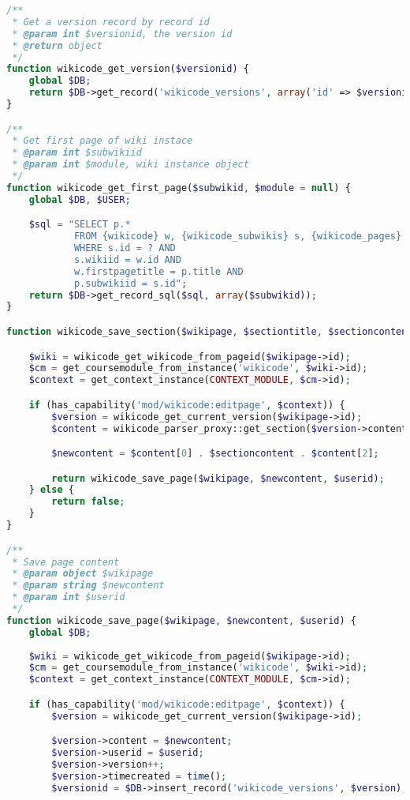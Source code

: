 \begin{lstlisting}[language=PHP]
/**
 * Get a version record by record id
 * @param int $versionid, the version id
 * @return object
 */
function wikicode_get_version($versionid) {
    global $DB;
    return $DB->get_record('wikicode_versions', array('id' => $versionid));
}

/**
 * Get first page of wiki instace
 * @param int $subwikiid
 * @param int $module, wiki instance object
 */
function wikicode_get_first_page($subwikid, $module = null) {
    global $DB, $USER;

    $sql = "SELECT p.*
            FROM {wikicode} w, {wikicode_subwikis} s, {wikicode_pages} p
            WHERE s.id = ? AND
            s.wikiid = w.id AND
            w.firstpagetitle = p.title AND
            p.subwikiid = s.id";
    return $DB->get_record_sql($sql, array($subwikid));
}

function wikicode_save_section($wikipage, $sectiontitle, $sectioncontent, $userid) {

    $wiki = wikicode_get_wikicode_from_pageid($wikipage->id);
    $cm = get_coursemodule_from_instance('wikicode', $wiki->id);
    $context = get_context_instance(CONTEXT_MODULE, $cm->id);

    if (has_capability('mod/wikicode:editpage', $context)) {
        $version = wikicode_get_current_version($wikipage->id);
        $content = wikicode_parser_proxy::get_section($version->content, $version->contentformat, $sectiontitle, true);

        $newcontent = $content[0] . $sectioncontent . $content[2];

        return wikicode_save_page($wikipage, $newcontent, $userid);
    } else {
        return false;
    }
}

/**
 * Save page content
 * @param object $wikipage
 * @param string $newcontent
 * @param int $userid
 */
function wikicode_save_page($wikipage, $newcontent, $userid) {
    global $DB;
    
    $wiki = wikicode_get_wikicode_from_pageid($wikipage->id);
    $cm = get_coursemodule_from_instance('wikicode', $wiki->id);
    $context = get_context_instance(CONTEXT_MODULE, $cm->id);

    if (has_capability('mod/wikicode:editpage', $context)) {
        $version = wikicode_get_current_version($wikipage->id);

        $version->content = $newcontent;
        $version->userid = $userid;
        $version->version++;
        $version->timecreated = time();
        $versionid = $DB->insert_record('wikicode_versions', $version);


\end{lstlisting}
